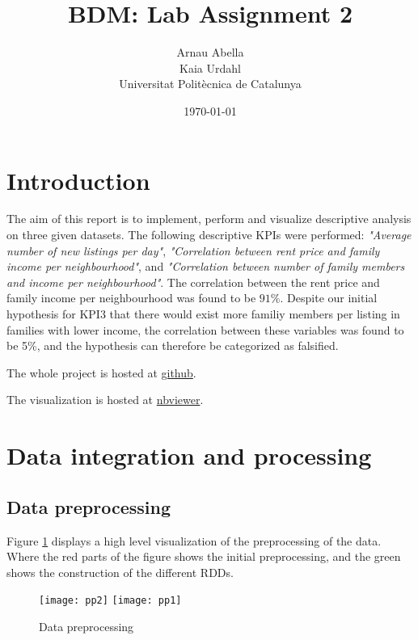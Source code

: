 \documentclass[12pt, a4paper]{article}
\title{%
  BDM: Lab Assignment 2
}
\author{%
  Arnau Abella \\
  Kaia Urdahl \\
  \large{Universitat Polit\`ecnica de Catalunya}
}
\date{\today}
\begin{document}
\maketitle

\section{Introduction}\label{section:intro}

The aim of this report is to implement, perform and visualize descriptive analysis on three given datasets.
The following descriptive KPIs were performed: \emph{"Average number of new listings per day"}, \emph{"Correlation between rent price and family income per neighbourhood"},
and \emph{"Correlation between number of family members and income per neighbourhood"}.
The correlation between the rent price and family income per neighbourhood was found to be $91\%$.
Despite our initial hypothesis for KPI3 that there would exist more familiy members per listing in families with lower income, the correlation between these variables was found to be 5\%, and the hypothesis can therefore be categorized as falsified.

The whole project is hosted at \href{https://github.com/monadplus/bdm-project/tree/master/p2}{github}.

The visualization is hosted at \href{https://nbviewer.jupyter.org/github/monadplus/bdm-project/blob/master/p2/visualization/visualization.ipynb}{nbviewer}.

\section{Data integration and processing}

\subsection{Data preprocessing}

Figure \ref{fig:pp1}  displays a high level visualization of the preprocessing of the data.
Where the red parts of the figure shows the initial preprocessing, and the green shows the construction of the different RDDs.

\begin{figure}[H]
\centering
\texttt{[image: pp2]}
\vspace{1cm}
\texttt{[image: pp1]}
\caption{Data preprocessing}
\label{fig:pp1}
\end{figure}
\end{document}
